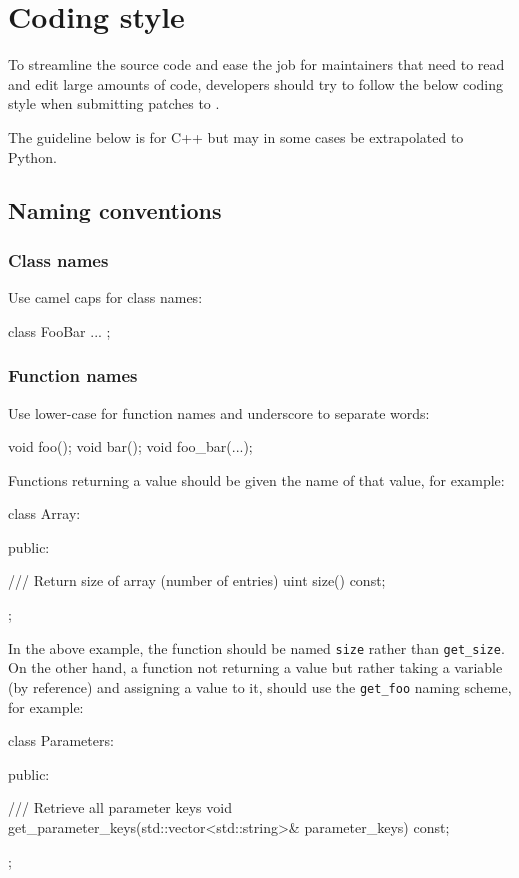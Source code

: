 \chapter{Coding style}
\label{sec:codingstyle}

To streamline the \dolfin{} source code and ease the job for
maintainers that need to read and edit large amounts of code,
developers should try to follow the below coding style when submitting
patches to \dolfin{}.

The guideline below is for C++ but may in some cases be extrapolated
to Python.

\section{Naming conventions}

\subsection{Class names}

Use camel caps for class names:
\begin{code}
class FooBar
{
  ...
};
\end{code}

\subsection{Function names}

Use lower-case for function names and underscore to separate words:
\begin{code}
void foo();
void bar();
void foo_bar(...);
\end{code}

Functions returning a value should be given the name of that value,
for example:
\begin{code}
class Array:
{
public:

  /// Return size of array (number of entries)
  uint size() const;

};
\end{code}

In the above example, the function should be named \texttt{size} rather
than \texttt{get\_size}. On the other hand, a function not returning a
value but rather taking a variable (by reference) and assigning a value
to it, should use the \texttt{get\_foo} naming scheme, for example:
\begin{code}
class Parameters:
{
public:

  /// Retrieve all parameter keys
  void get_parameter_keys(std::vector<std::string>& parameter_keys) const;

};
\end{code}

